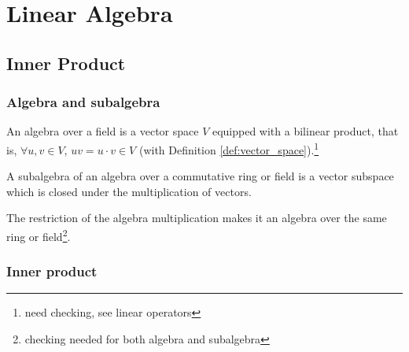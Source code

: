 \chapter{Linear Algebra}%

\section{Inner Product}

\subsection{Algebra and subalgebra}

\begin{definition}\label{def:algebra}
An algebra over a field is a vector space $V$ equipped with a bilinear product, that is, $\forall u,v\in V$, $uv = u\cdot v \in V$ (with Definition \ref{def:vector_space}).\footnote{need checking, see linear operators}%
\end{definition}

\begin{definition}\label{def:subalgebra}
A subalgebra of an algebra over a commutative ring or field is a vector subspace which is closed under the multiplication of vectors.%
\end{definition}

\begin{remark}
The restriction of the algebra multiplication makes it an algebra over the same ring or field\footnote{checking needed for both algebra and subalgebra}.
\end{remark}


\subsection{Inner product}


